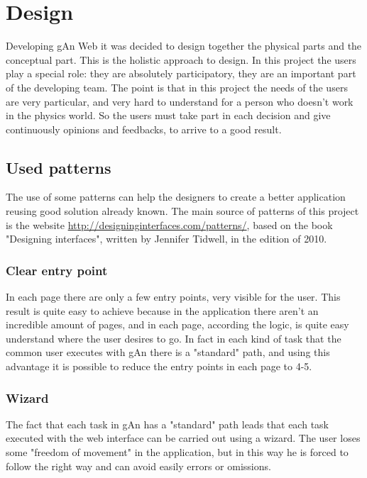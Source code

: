 
\chapter{Design} %

\label{Chapter6} %

Developing gAn Web it was decided to design together the physical parts and the conceptual part. This is the holistic approach to design. In this project the users play a special role: they are absolutely participatory, they are an important part of the developing team.
The point is that in this project the needs of the users are very particular, and very hard to understand for a person who doesn't work in the physics world. So the users must take part in each decision and give continuously opinions and feedbacks, to arrive to a good result.

\section{Used patterns}

The use of some patterns can help the designers to create a better application reusing good solution already known.
The main source of patterns of this project is the website \url{http://designinginterfaces.com/patterns/}, based on the book "Designing interfaces", written by Jennifer Tidwell, in the edition of 2010.

\subsection{Clear entry point} 

In each page there are only a few entry points, very visible for the user. This result is quite easy to achieve because in the application there aren't an incredible amount of pages, and in each page, according the logic, is quite easy understand where the user desires to go. In fact in each kind of task that the common user executes with gAn there is a "standard" path, and using this advantage it is possible to reduce the entry points in each page to 4-5. 

\subsection{Wizard}
The fact that each task in gAn has a "standard" path leads that each task executed with the web interface can be carried out using a wizard. The user loses some "freedom of movement" in the application, but in this way he is forced to follow the right way and can avoid easily errors or omissions.

